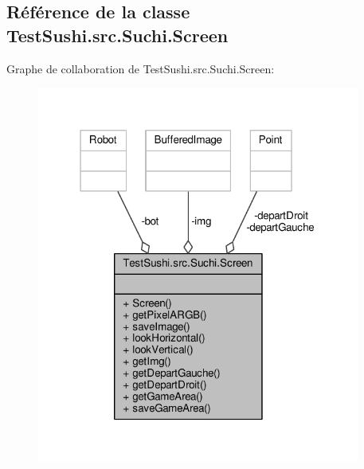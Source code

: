 \hypertarget{classTestSushi_1_1src_1_1Suchi_1_1Screen}{}\subsection{Référence de la classe Test\+Sushi.\+src.\+Suchi.\+Screen}
\label{classTestSushi_1_1src_1_1Suchi_1_1Screen}


Graphe de collaboration de Test\+Sushi.\+src.\+Suchi.\+Screen\+:\nopagebreak
\begin{figure}[H]
\begin{center}
\leavevmode
\includegraphics[width=301pt]{classTestSushi_1_1src_1_1Suchi_1_1Screen__coll__graph}
\end{center}
\end{figure}
